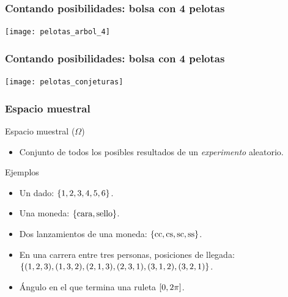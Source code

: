 \documentclass[table]{beamer}
\begin{document}
\begin{frame}
    \frametitle{Contando posibilidades: bolsa con 4 pelotas}
    \begin{center}
        \texttt{[image: pelotas\_arbol\_4]}
    \end{center}
\end{frame}

\begin{frame}
    \frametitle{Contando posibilidades: bolsa con 4 pelotas}
    \begin{center}
        \texttt{[image: pelotas\_conjeturas]}
    \end{center}
\end{frame}
\fi

\begin{frame}
    \frametitle{Espacio muestral}
    \begin{block}{Espacio muestral ($\Omega$)}
        \begin{itemize}
            \item Conjunto de todos los posibles resultados de un \emph{experimento} aleatorio.
        \end{itemize}
    \end{block}
    \begin{block}{Ejemplos}
        \begin{itemize}
            \item Un dado: $\bparens{1 , 2 , 3 , 4 , 5 , 6}$.
            \item Una moneda: $\bparens{\text{cara} , \text{sello}}$.
            \item Dos lanzamientos de una moneda: $\bparens{\text{cc}, \text{cs}, \text{sc}, \text{ss}}$.
            \item En una carrera entre tres personas, posiciones de llegada: $\bparens{\parens{1, 2, 3}, \parens{1, 3, 2}, \parens{2, 1, 3}, \parens{2, 3, 1}, \parens{3, 1, 2}, \parens{3, 2, 1}}$.
            \item Ángulo en el que termina una ruleta $\sparens{0, 2 \pi}$.
        \end{itemize}
    \end{block}
\end{frame}
\end{document}
